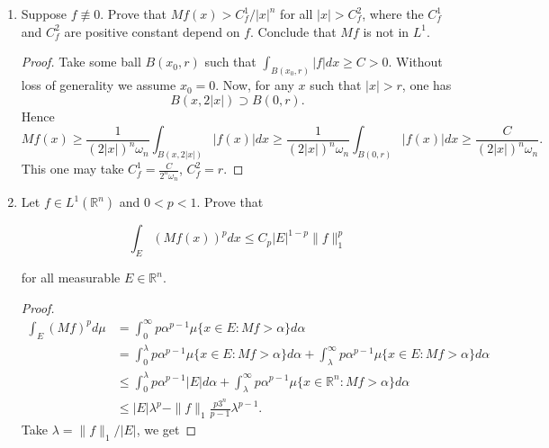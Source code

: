 \begin{enumerate}
\begin{proof}
\textbf{Case 3: \( x \geq b \)}. \\
For \( x \geq b \), the interval \( [x-r, x+r] \) will overlap \( [a, b] \) when \( r > x - b \), and the overlap length is \( r - (x - b) \). Hence,
\[
Mf(x) = \sup_{r > x - b} \frac{1}{2r} \cdot (b - a) = \frac{b - a}{2(x - b)}.
\]

Thus, combining all cases, we have
\[
Mf(x) = \begin{cases}
\frac{b - a}{2(a - x)}, & x \leq a, \\
1, & x \in (a, b), \\
\frac{b - a}{2(x - b)}, & x \geq b.
\end{cases}
\]
\end{proof}

\item Suppose $f \not \equiv 0$. Prove that $M f(x)>C_f^1 /|x|^n$ for all $|x|>C_f^2$, where the $C_f^1$ and $C_f^2$ are positive constant depend on $f$. Conclude that $M f$ is not in $L^1$.

\begin{proof}
	Take some ball $B(x_0, r)$ such that $\int _{B(x_0, r)} |f| dx \ge C > 0$. Without loss of generality we assume $x_0 = 0$. Now, for any $x$ such that $|x| > r$, one has
	\[
		B(x, 2 |x|) \supset B(0, r)
	.\] 
	Hence
	\[
		M f(x) 
		\ge \frac{1}{(2|x|)^n \omega_n} \int_{B(x, 2|x|)}|f(x)| dx
		\ge \frac{1}{(2|x|)^n \omega_n} \int_{B(0,r)}|f(x)| dx
		\ge \frac{C}{(2|x|)^n \omega_n}
	.\] 
	This one may take $C^1_f = \frac{C}{2^n \omega_n}$, $C^2_f = r$.
\end{proof}

\item Let $f \in L^1\left(\mathbb{R}^n\right)$ and $0<p<1$. Prove that

\[
\int_E(M f(x))^p d x \leq C_p|E|^{1-p}\|f\|_1^p
\]

for all measurable $E \in \mathbb{R}^n$.
\begin{proof}
	\begin{align*}
		\int _E (Mf)^p d \mu
		&= \int _0^\infty p \alpha^{ p - 1} \mu \{x \in E: M f > \alpha\}  d \alpha \\
		&= \int _0^\lambda p \alpha^{ p - 1} \mu \{x \in E: M f > \alpha\}  d \alpha +
		 \int _\lambda^\infty p \alpha^{ p - 1} \mu \{x \in E: M f > \alpha\}  d \alpha \\
		&\leq \int _0^\lambda p \alpha^{ p - 1} |E|  d \alpha +
		 \int _\lambda^\infty p \alpha^{ p - 1} \mu \{x \in \mathbb{R}^n: M f > \alpha\}  d \alpha \\
		 &\leq |E| \lambda^p - \|f\|_1 \frac{p 3^n}{p - 1} \lambda^{p - 1}
	.\end{align*}
	Take $\lambda = \|f\|_1 / |E|$, we get


\end{proof}
\end{enumerate}
